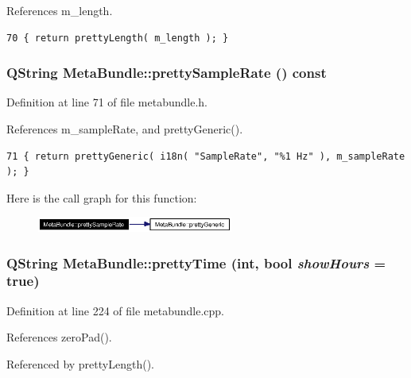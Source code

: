 References m\_\-length.



\footnotesize\begin{verbatim}70 { return prettyLength( m_length ); }
\end{verbatim}\normalsize 
{}
\subsubsection{\setlength{\rightskip}{0pt plus 5cm}QString Meta\-Bundle::pretty\-Sample\-Rate () const\hspace{0.3cm}{\tt  [inline]}}\label{classMetaBundle_MetaBundlea21}




Definition at line 71 of file metabundle.h.

References m\_\-sample\-Rate, and pretty\-Generic().



\footnotesize\begin{verbatim}71 { return prettyGeneric( i18n( "SampleRate", "%1 Hz" ), m_sampleRate ); }
\end{verbatim}\normalsize 


Here is the call graph for this function:\begin{figure}[H]
\begin{center}
\leavevmode
\includegraphics[width=182pt]{classMetaBundle_MetaBundlea21_cgraph}
\end{center}
\end{figure}
\subsubsection{\setlength{\rightskip}{0pt plus 5cm}QString Meta\-Bundle::pretty\-Time (int, bool {\em show\-Hours} = true)\hspace{0.3cm}{\tt  [static]}}\label{classMetaBundle_MetaBundlee2}




Definition at line 224 of file metabundle.cpp.

References zero\-Pad().

Referenced by pretty\-Length().



